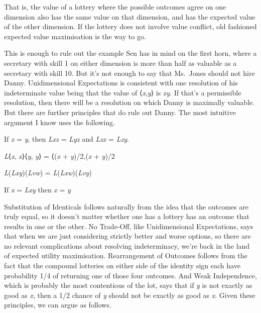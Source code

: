 \documentclass[
  10.5pt,
  twoside]{article}
\providecommand{\tightlist}{%
  \setlength{\itemsep}{0pt}\setlength{\parskip}{0pt}}
\let\olddescription\description
\let\endolddescription\enddescription
\renewenvironment{description}
  {\vskip 5pt\olddescription}
  {\endolddescription\vskip 5pt}
\begin{document}
That is, the value of a lottery where the possible outcomes agree on one
dimension also has the same value on that dimension, and has the
expected value of the other dimension. If the lottery does not involve
value conflict, old fashioned expected value maximisation is the way to
go.

This is enough to rule out the example Sen has in mind on the first
horn, where a secretary with skill 1 on either dimension is more than
half as valuable as a secretary with skill 10. But it's not enough to
say that Ms.~Jones should not hire Danny. Unidimensional Expectations is
consistent with one resolution of his indeterminate value being that the
value of ⟨\emph{x},\emph{y}⟩ is \emph{xy}. If that's a permissible
resolution, then there will be a resolution on which Danny is maximally
valuable. But there are further principles that do rule out Danny. The
most intuitive argument I know uses the following.

\begin{description}
\tightlist
\item[Substitution of Identicals (SI)]
If \emph{x} = \emph{y}, then \emph{Lxz} = \emph{Lyz} and \emph{Lzx} =
\emph{Lzy}.
\item[No Trade-Off (NT)]
\emph{L}⟨\emph{x}, \emph{x}⟩⟨\emph{y}, \emph{y}⟩ = ⟨(\emph{x} +
\emph{y})/2,(\emph{x} + \emph{y})/2
\item[Rearrangement of Outcomes (RO)]
\emph{L}(\emph{Lxy})(\emph{Lvw}) = \emph{L}(\emph{Lxw})(\emph{Lvy})
\item[Weak Independence (WI)]
If \emph{x} = \emph{Lxy} then \emph{x} = \emph{y}
\end{description}

Substitution of Identicals follows naturally from the idea that the
outcomes are truly equal, so it doesn't matter whether one has a lottery
has an outcome that results in one or the other. No Trade-Off, like
Unidimensional Expectations, says that when we are just considering
strictly better and worse options, so there are no relevant
complications about resolving indeterminacy, we're back in the land of
expected utility maximisation. Rearrangement of Outcomes follows from
the fact that the compound lotteries on either side of the identity sign
each have probability 1/4 of returning one of those four outcomes. And
Weak Independence, which is probably the most contentious of the lot,
says that if \emph{y} is not exactly as good as \emph{x}, then a 1/2
chance of \emph{y} should not be exactly as good as \emph{x}. Given
these principles, we can argue as follows.
\end{document}
